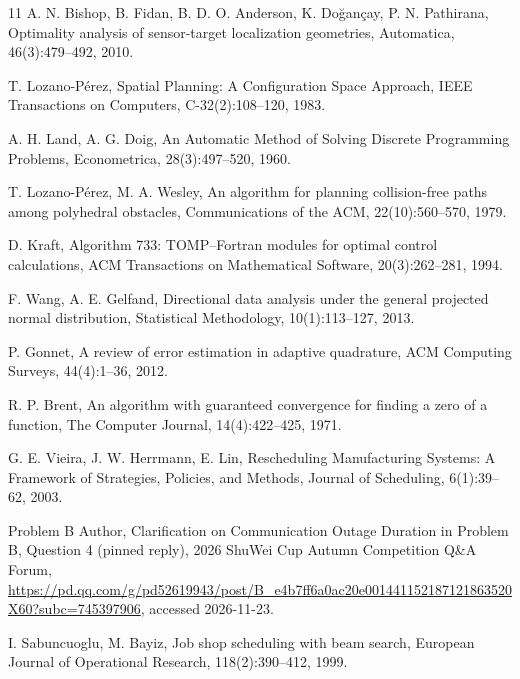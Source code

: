 \documentclass{swmcmthesis}
\begin{document}
\clearpage
\begin{thebibliography}{11}
A. N. Bishop, B. Fidan, B. D. O. Anderson, K. Doğançay, P. N. Pathirana, Optimality analysis of sensor-target localization geometries, Automatica, 46(3):479--492, 2010.

T. Lozano-Pérez, Spatial Planning: A Configuration Space Approach, IEEE Transactions on Computers, C-32(2):108--120, 1983.

A. H. Land, A. G. Doig, An Automatic Method of Solving Discrete Programming Problems, Econometrica, 28(3):497--520, 1960.

T. Lozano-Pérez, M. A. Wesley, An algorithm for planning collision-free paths among polyhedral obstacles, Communications of the ACM, 22(10):560--570, 1979.

D. Kraft, Algorithm 733: TOMP--Fortran modules for optimal control calculations, ACM Transactions on Mathematical Software, 20(3):262--281, 1994.

F. Wang, A. E. Gelfand, Directional data analysis under the general projected normal distribution, Statistical Methodology, 10(1):113--127, 2013.

P. Gonnet, A review of error estimation in adaptive quadrature, ACM Computing Surveys, 44(4):1--36, 2012.

R. P. Brent, An algorithm with guaranteed convergence for finding a zero of a function, The Computer Journal, 14(4):422--425, 1971.

G. E. Vieira, J. W. Herrmann, E. Lin, Rescheduling Manufacturing Systems: A Framework of Strategies, Policies, and Methods, Journal of Scheduling, 6(1):39--62, 2003.

{\raggedright{}%
Problem B Author, Clarification on Communication Outage Duration in Problem B, Question 4 (pinned reply), 2026 ShuWei Cup Autumn Competition Q\&A Forum,
\url{https://pd.qq.com/g/pd52619943/post/B_e4b7ff6a0ac20e001441152187121863520X60?subc=745397906}, accessed 2026-11-23.\par}

I. Sabuncuoglu, M. Bayiz, Job shop scheduling with beam search, European Journal of Operational Research, 118(2):390--412, 1999.

\end{thebibliography}
\end{document}
